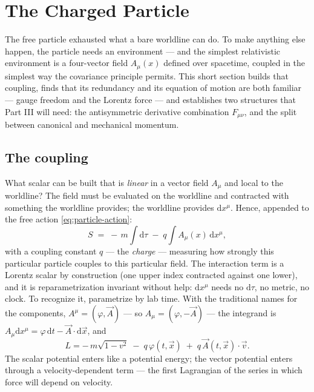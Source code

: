 \documentclass[11pt]{article}
\theoremstyle{plain}
\theoremstyle{definition}
\theoremstyle{remark}
\newcommand{\dd}{\mathrm{d}}
\newcommand{\vx}{\vec{x}}
\newcommand{\vv}{\vec{v}}
\begin{document}
\section{The Charged Particle}
\label{sec:charged-particle}

The free particle exhausted what a bare worldline can do. To make
anything else happen, the particle needs an environment --- and the
simplest relativistic environment is a four-vector field
$A_\mu(x)$ defined over spacetime, coupled in the simplest way the
covariance principle permits. This short section builds that coupling,
finds that its redundancy and its equation of motion are both familiar
--- gauge freedom and the Lorentz force ---
and establishes two structures that Part III will need: the antisymmetric
derivative combination $F_{\mu\nu}$, and the split between canonical
and mechanical momentum.

\subsection{The coupling}
\label{sec:coupling}

What scalar can be built that is \emph{linear} in a vector field
$A_\mu$ and local to the worldline? The field must be evaluated on the
worldline and contracted with something the worldline provides; the
worldline provides $\dd x^\mu$. Hence, appended to the free action
\eqref{eq:particle-action}:
\begin{equation}
  \boxed{\;
  S \;=\; -\,m \int \dd\tau
  \;-\; q \int A_\mu(x)\,\dd x^\mu ,
  \;}
  \label{eq:charged-action}
\end{equation}
with a coupling constant $q$ --- the \emph{charge} --- measuring how
strongly this particular particle couples to this particular field.
The interaction term is a Lorentz scalar by construction (one upper
index contracted against one lower), and it is reparametrization invariant without
help: $\dd x^\mu$ needs no $\dd\tau$, no metric, no clock. To
recognize it, parametrize by lab time. With the traditional names for
the components, $A^\mu = (\varphi, \vec A)$ --- so
$A_\mu = (\varphi, -\vec A)$ --- the integrand is
$A_\mu \dd x^\mu = \varphi\,\dd t - \vec A \cdot \dd\vx$, and
\begin{equation}
  L = -\,m\sqrt{1 - v^2}
      \;-\; q\,\varphi(t, \vx)
      \;+\; q\,\vec A(t, \vx) \cdot \vv .
  \label{eq:charged-lagrangian}
\end{equation}
The scalar potential enters like a potential energy; the vector
potential enters through a velocity-dependent term --- the first
Lagrangian of the series in which force will depend on velocity.
\end{document}
